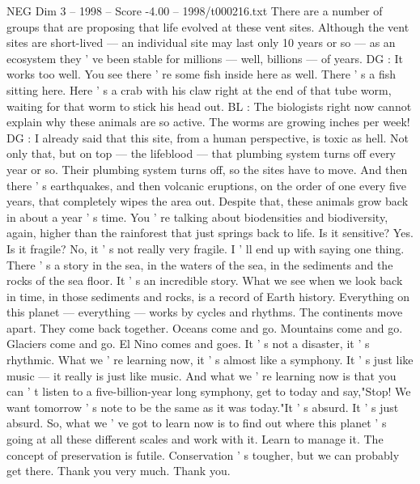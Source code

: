 \begin{textsample}{NEG Dim 3 – 1998 – Score -4.00 – 1998/t000216.txt}
There are a number of groups that are proposing that life evolved at these vent sites.
Although the vent sites are short-lived — an individual site may last only 10 years or so — as an ecosystem they ' ve been stable for millions — well, billions — of years.
DG : It works too well.
You see there ' re some fish inside here as well.
There ' s a fish sitting here.
Here ' s a crab with his claw right at the end of that tube worm, waiting for that worm to stick his head out.
BL : The biologists right now cannot explain why these animals are so active.
The worms are growing inches per week!
DG : I already said that this site, from a human perspective, is toxic as hell.
Not only that, but on top — the lifeblood — that plumbing system turns off every year or so.
Their plumbing system turns off, so the sites have to move.
And then there ' s earthquakes, and then volcanic eruptions, on the order of one every five years, that completely wipes the area out.
Despite that, these animals grow back in about a year ' s time.
You ' re talking about biodensities and biodiversity, again, higher than the rainforest that just springs back to life.
Is it sensitive?
Yes.
Is it fragile?
No, it ' s not really very fragile.
I ' ll end up with saying one thing.
There ' s a story in the sea, in the waters of the sea, in the sediments and the rocks of the sea floor.
It ' s an incredible story.
What we see when we look back in time, in those sediments and rocks, is a record of Earth history.
Everything on this planet — everything — works by cycles and rhythms.
The continents move apart.
They come back together.
Oceans come and go.
Mountains come and go.
Glaciers come and go.
El Nino comes and goes.
It ' s not a disaster, it ' s rhythmic.
What we ' re learning now, it ' s almost like a symphony.
It ' s just like music — it really is just like music.
And what we ' re learning now is that you can ' t listen to a five-billion-year long symphony, get to today and say,"Stop!
We want tomorrow ' s note to be the same as it was today."It ' s absurd.
It ' s just absurd.
So, what we ' ve got to learn now is to find out where this planet ' s going at all these different scales and work with it.
Learn to manage it.
The concept of preservation is futile.
Conservation ' s tougher, but we can probably get there.
Thank you very much.
Thank you.

\end{textsample}
